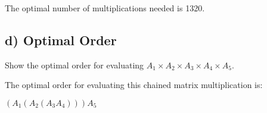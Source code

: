\documentclass[11pt]{article}
\begin{document}
\bigskip

\noindent The optimal number of multiplications needed is 1320.

\subsection*{d) Optimal Order}
Show the optimal order for evaluating $A_1 \times A_2 \times A_3 \times A_4 \times A_5$. \\

\bigskip

\noindent The optimal order for evaluating this chained matrix multiplication is:

\begin{center}
$(A_1(A_2(A_3 A_4)))A_5$
\end{center}



\end{document}
